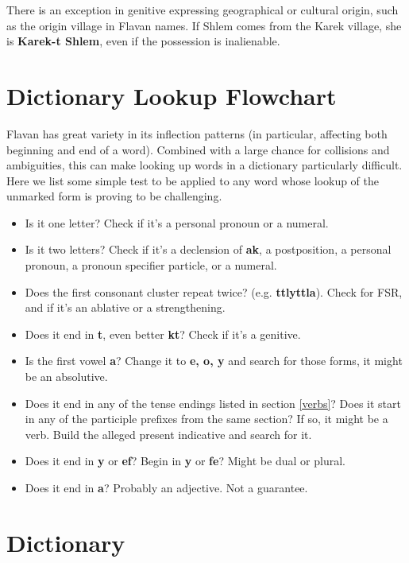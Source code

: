 \documentclass[10pt,oneside]{memoir}
\newcommand{\fsr}{FSR}
\begin{document}
There is an exception in genitive expressing geographical or cultural origin, such as the origin village in Flavan names. If Shlem comes from the Karek village, she is \textbf{Karek-t Shlem}, even if the possession is inalienable.




\pagebreak
\section{Dictionary Lookup Flowchart}

Flavan has great variety in its inflection patterns (in particular, affecting both beginning and end of a word). Combined with a large chance for collisions and ambiguities, this can make looking up words in a dictionary particularly difficult. Here we list some simple test to be applied to any word whose lookup of the unmarked form is proving to be challenging.

\begin{itemize}
    \item Is it one letter? Check if it's a personal pronoun or a numeral.
    \item Is it two letters? Check if it's a declension of \textbf{ak}, a postposition, a personal pronoun, a pronoun specifier particle, or a numeral.
    \item Does the first consonant cluster repeat twice? (e.g. \textbf{ttlyttla}). Check for \fsr , and if it's an ablative or a strengthening.
    \item Does it end in \textbf{t}, even better \textbf{kt}? Check if it's a genitive.
    \item Is the first vowel \textbf{a}? Change it to \textbf{e, o, y} and search for those forms, it might be an absolutive.
    \item Does it end in any of the tense endings listed in section \ref{verbs}? Does it start in any of the participle prefixes from the same section? If so, it might be a verb. Build the alleged present indicative and search for it.
    \item Does it end in \textbf{y} or \textbf{ef}? Begin in \textbf{y} or \textbf{fe}? Might be dual or plural.
    \item Does it end in \textbf{a}? Probably an adjective. Not a guarantee.
\end{itemize}

\pagebreak

\section{Dictionary}
\end{document}
